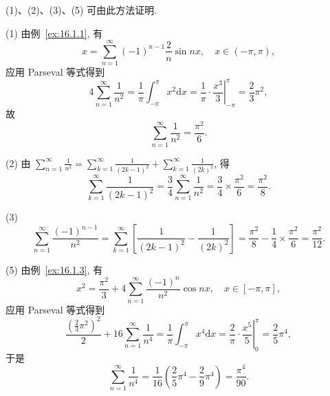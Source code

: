 \begin{solution}[证法 1]
(1)、(2)、(3)、(5) 可由此方法证明.

(1) 由例~\ref{ex:16.1.1}, 有
\[
  x=\sum_{n=1}^{\infty}(-1)^{n-1}\frac{2}{n}\sin n x,\quad x\in(-\pi,\pi),
\]
应用 Parseval 等式得到
\[
  4\sum_{n=1}^{\infty}\frac{1}{n^{2}}=\frac{1}{\pi}\int_{-\pi}^{\pi}x^{2}\mathrm{d}x=\frac{1}{\pi}\cdot\left.\frac{x^{3}}{3}\right|_{-\pi}^{\pi}=\frac{2}{3}\pi^{2},
\]
故
\[
  \sum_{n=1}^{\infty}\frac{1}{n^{2}}=\frac{\pi^{2}}{6}.
\]

(2) 由 $\sum_{n=1}^{\infty}\frac{1}{n^{2}}=\sum_{k=1}^{\infty}\frac{1}{(2k-1)^{2}}+\sum_{k=1}^{\infty}\frac{1}{(2k)^{2}}$, 得
\[
  \sum_{k=1}^{\infty}\frac{1}{(2k-1)^{2}}=\frac{3}{4}\sum_{n=1}^{\infty}\frac{1}{n^{2}}=\frac{3}{4}\times\frac{\pi^{2}}{6}=\frac{\pi^{2}}{8}.
\]

(3)
\[
  \sum_{n=1}^{\infty}\frac{(-1)^{n-1}}{n^{2}}=\sum_{k=1}^{\infty}\left[\frac{1}{(2k-1)^{2}}-\frac{1}{(2k)^{2}}\right]=\frac{\pi^{2}}{8}-\frac{1}{4}\times\frac{\pi^{2}}{6}=\frac{\pi^{2}}{12}.
\]

(5) 由例~\ref{ex:16.1.3}, 有
\[
  x^{2}=\frac{\pi^{2}}{3}+4\sum_{n=1}^{\infty}\frac{(-1)^{n}}{n^{2}}\cos nx,\quad x\in[-\pi,\pi],
\]
应用 Parseval 等式得到
\[
  \frac{\left(\frac{2}{3}\pi^{2}\right)^{2}}{2}+16\sum_{n=1}^{\infty}\frac{1}{n^{4}}=\frac{1}{\pi}\int_{-\pi}^{\pi}x^{4}\mathrm{d}x=\frac{2}{\pi}\cdot\left.\frac{x^{5}}{5}\right|_{0}^{\pi}=\frac{2}{5}\pi^{4},
\]
于是
\[
  \sum_{n=1}^{\infty}\frac{1}{n^{4}}=\frac{1}{16}\left(\frac{2}{5}\pi^{4}-\frac{2}{9}\pi^{4}\right)=\frac{\pi^{4}}{90}.
\]
\noqedhere
\end{solution}


